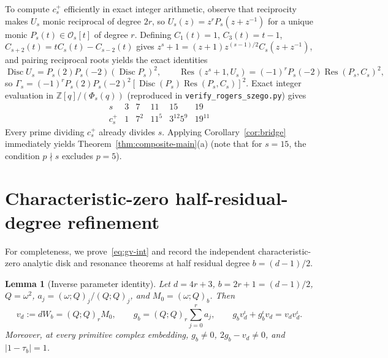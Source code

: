 \documentclass[11pt,reqno]{amsart}
\numberwithin{equation}{section}
\newtheorem{lemma}[theorem]{Lemma}
\theoremstyle{definition}
\theoremstyle{remark}
\newcommand{\Z}{\mathbb{Z}}
\newcommand{\Disc}{\operatorname{Disc}}
\newcommand{\Res}{\operatorname{Res}}
\newcommand{\poch}[3]{(#1;#2)_{#3}}
\begin{document}
To compute $c_s^+$ efficiently in exact integer arithmetic, observe that reciprocity makes $U_s$ monic reciprocal of degree $2r$, so $U_s(z)=z^r P_s(z+z^{-1})$ for a unique monic $P_s(t)\in\mathcal{O}_s[t]$ of degree $r$. Defining $C_1(t)=1$, $C_3(t)=t-1$, $C_{s+2}(t)=tC_s(t)-C_{s-2}(t)$ gives $z^s+1=(z+1)z^{(s-1)/2}C_s(z+z^{-1})$, and pairing reciprocal roots yields the exact identities
\begin{equation}
\label{eq:recip-red}
\Disc U_s = P_s(2)P_s(-2)(\Disc P_s)^2,\qquad
\Res(z^s+1,U_s) = (-1)^r P_s(-2)\Res(P_s,C_s)^2,
\end{equation}
so $\Gamma_s = (-1)^r P_s(2)P_s(-2)^2[\Disc(P_s)\Res(P_s,C_s)]^2$. Exact integer evaluation in $\Z[q]/(\Phi_s(q))$ (reproduced in \texttt{verify\_rogers\_szego.py}) gives
\begin{equation}
\label{eq:5fam-vals}
\begin{array}{c|ccccc}
s & 3 & 7 & 11 & 15 & 19\\ \hline
c_s^+ & 1 & 7^2 & 11^5 & 3^{12}5^9 & 19^{11}
\end{array}
\end{equation}
Every prime dividing $c_s^+$ already divides $s$. Applying Corollary~\ref{cor:bridge} immediately yields Theorem~\ref{thm:composite-main}(a) (note that for $s=15$, the condition $p\nmid s$ excludes $p=5$).

\section{Characteristic-zero half-residual-degree refinement}
\label{sec:char0-half}

For completeness, we prove~\eqref{eq:gv-int} and record the independent characteristic-zero analytic disk and resonance theorems at half residual degree $b=(d-1)/2$.

\begin{lemma}[Inverse parameter identity]
\label{lem:inv-id}
Let $d=4r+3$, $b=2r+1=(d-1)/2$, $Q=\omega^2$, $a_j=\poch{\omega}{Q}{j}/\poch{Q}{Q}{j}$, and $M_0=\poch{\omega}{Q}{b}$. Then
\[
v_d := dW_b = \poch{Q}{Q}{r}M_0,\qquad g_b = \poch{Q}{Q}{r}\sum_{j=0}^r a_j,\qquad
g_b v_d^\iota + g_b^\iota v_d = v_d v_d^\iota.
\]
Moreover, at every primitive complex embedding, $g_b\neq 0$, $2g_b-v_d\neq 0$, and $|1-\tau_b|=1$.
\end{lemma}
\end{document}
